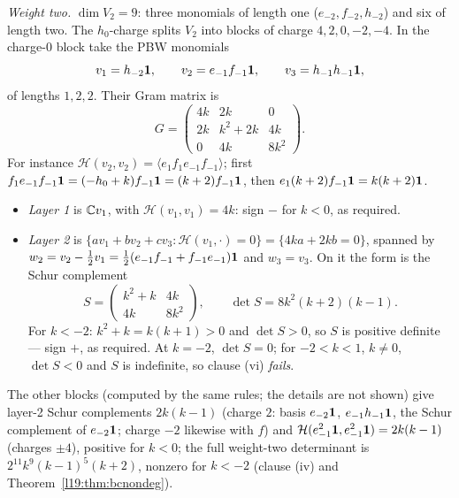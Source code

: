 \begin{example}
\emph{Weight two.} $\dim V_2 = 9$: three monomials of length one ($e_{-2},f_{-2},h_{-2}$) and six of length two. The
$h_0$-charge splits $V_2$ into blocks of charge $4,2,0,-2,-4$. In the charge-$0$ block take the PBW monomials
\begin{equation*}
  v_1 = h_{-2}\mathbf{1},\qquad v_2 = e_{-1}f_{-1}\mathbf{1},\qquad v_3 = h_{-1}h_{-1}\mathbf{1},
\end{equation*}
of lengths $1,2,2$. Their Gram matrix is
\begin{equation*}
  G = \begin{pmatrix} 4k & 2k & 0\\ 2k & k^2+2k & 4k\\ 0 & 4k & 8k^2\end{pmatrix}.
\end{equation*}
For instance $\mathcal H(v_2,v_2) = \langle e_1f_1e_{-1}f_{-1}\rangle$; first
$f_1e_{-1}f_{-1}\mathbf{1} = (-h_0+k)f_{-1}\mathbf{1} = (k+2)f_{-1}\mathbf{1}$, then $e_1(k+2)f_{-1}\mathbf{1} = k(k+2)\mathbf{1}$.
\begin{itemize}
\item \emph{Layer 1} is ${\mathbb{C}} v_1$, with $\mathcal H(v_1,v_1) = 4k$: sign $-$ for $k<0$, as required.
\item \emph{Layer 2} is $\{av_1+bv_2+cv_3 : \mathcal H(v_1,\cdot) = 0\} = \{4ka+2kb = 0\}$, spanned by
  $w_2 = v_2-\tfrac12v_1 = \tfrac12(e_{-1}f_{-1}+f_{-1}e_{-1})\mathbf{1}$ and $w_3 = v_3$. On it the form is the Schur complement
  \begin{equation*}
    S = \begin{pmatrix} k^2+k & 4k\\ 4k & 8k^2\end{pmatrix},\qquad \det S = 8k^2(k+2)(k-1).
  \end{equation*}
  For $k<-2$: $k^2+k = k(k+1)>0$ and $\det S>0$, so $S$ is positive definite --- sign $+$, as required. At $k = -2$,
  $\det S = 0$; for $-2<k<1$, $k\ne0$, $\det S<0$ and $S$ is indefinite, so clause (vi) \emph{fails}.
\end{itemize}
The other blocks (computed by the same rules; the details are not shown) give layer-2 Schur complements $2k(k-1)$
(charge $2$: basis $e_{-2}\mathbf{1}$, $e_{-1}h_{-1}\mathbf{1}$, the Schur complement of $e_{-2}\mathbf{1}$; charge $-2$
likewise with $f$) and
$\mathcal H(e_{-1}^2\mathbf{1},e_{-1}^2\mathbf{1}) = 2k(k-1)$ (charges $\pm4$), positive for $k<0$; the full weight-two determinant is
$2^{11}k^9(k-1)^5(k+2)$, nonzero for $k<-2$ (clause (iv) and Theorem~\ref{l19:thm:bcnondeg}).


\end{example}
